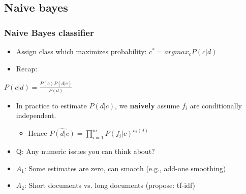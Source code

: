 \documentclass{beamer}
\begin{document}
\subsection{Naive bayes}
\begin{frame}
	\frametitle{Naive Bayes classifier}
	\begin{itemize}
		\item Assign class which maximizes probability: $c^{*}=argmax_{c} P(c|d)$
		\pause
		\item Recap:
	\end{itemize}
	
	\begin{Definition}
		\center
		$P(c|d) = \frac{P(c)P(d|c)}{P(d)}$
	\end{Definition}
	\pause
	\begin{itemize}
		\item In practice to estimate $P(d|c)$, we \textbf{naively} assume $f_i$ are conditionally independent.
		\pause
		\begin{itemize}
			\item Hence $\widehat{P(d|c)}=\prod_{i=1}^{m}P(f_i|c)^{n_i(d)}$ 
		\end{itemize}
		\pause
		\item Q: Any numeric issues you can think about?
		\pause
		\item $A_1$: Some estimates are zero, can smooth (e.g., add-one smoothing) 
		\pause
		\item $A_2$: Short documents vs. long documents (propose: tf-idf)
	\end{itemize}
\end{frame}

\end{document}
